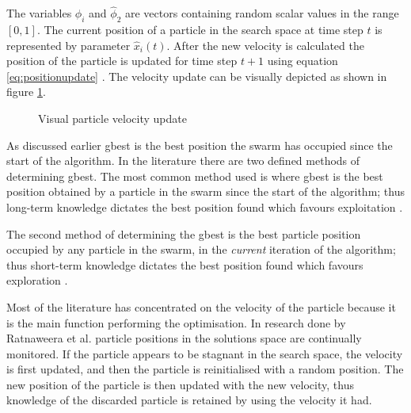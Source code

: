 The variables $\hat{\phi}_i$ and $\hat{\phi}_2$ are vectors containing random scalar values in the range $[0,1]$. The current position of a particle in the search space at time step $t$ is represented by parameter $\hat{x}_i(t)$\cite{FundamentalSwarm,CompuIntelligenceIntro}. After the new velocity is calculated the position of the particle is updated for time step $t+1$ using equation \ref{eq:positionupdate} \cite{FundamentalSwarm,CompuIntelligenceIntro}. The velocity update can be visually depicted as shown in figure \ref{fig:particleVelocityUpdate}. 
\begin{figure}[H]
	\begin{center}
	\caption{Visual particle velocity update \cite{SOSwarm,FundamentalSwarm,CompuIntelligenceIntro,PSOSelfHierarch}}
	\label{fig:particleVelocityUpdate}
	\end{center}
\end{figure}

As discussed earlier gbest is the best position the swarm has occupied since the start of the algorithm. In the literature there are two defined methods of determining gbest. The most common method used is where gbest is the best position obtained by a particle in the swarm since the start of the algorithm; thus long-term knowledge dictates the best position found which favours exploitation \cite{CompuIntelligenceIntro,FundamentalSwarm}.

The second method of determining the gbest is the best particle position occupied by any particle in the swarm, in the \emph{current} iteration of the algorithm; thus short-term knowledge dictates the best position found which favours exploration \cite{CompuIntelligenceIntro,FundamentalSwarm}.

Most of the literature has concentrated on the velocity of the particle because it is the main function performing the optimisation. In research done by Ratnaweera et al.\cite{PSOSelfHierarch} particle positions in the solutions space are continually monitored. If the particle appears to be stagnant in the search space, the velocity is first updated, and then the particle is reinitialised with a random position. The new position of the particle is then updated with the new velocity, thus knowledge of the discarded particle is retained by using the velocity it had\cite{PSOSelfHierarch}.

